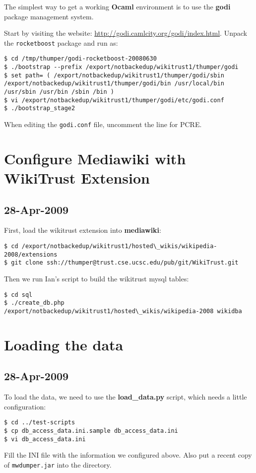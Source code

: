 The simplest way to get a working \textbf{Ocaml} environment is
to use the \textbf{godi} package management system.

Start by visiting the website:
\url{http://godi.camlcity.org/godi/index.html}.
Unpack the \texttt{rocketboost} package and run as:
\begin{verbatim}
$ cd /tmp/thumper/godi-rocketboost-20080630
$ ./bootstrap --prefix /export/notbackedup/wikitrust1/thumper/godi
$ set path= ( /export/notbackedup/wikitrust1/thumper/godi/sbin /export/notbackedup/wikitrust1/thumper/godi/bin /usr/local/bin /usr/sbin /usr/bin /sbin /bin )
$ vi /export/notbackedup/wikitrust1/thumper/godi/etc/godi.conf
$ ./bootstrap_stage2
\end{verbatim}
When editing the \texttt{godi.conf} file, uncomment the line
for PCRE.


\section{Configure Mediawiki with WikiTrust Extension}

\subsection{28-Apr-2009}

First, load the wikitrust extension into \textbf{mediawiki}:
\begin{verbatim}
$ cd /export/notbackedup/wikitrust1/hosted\_wikis/wikipedia-2008/extensions
$ git clone ssh://thumper@trust.cse.ucsc.edu/pub/git/WikiTrust.git
\end{verbatim}

Then we run Ian's script to build the wikitrust mysql tables:
\begin{verbatim}
$ cd sql
$ ./create_db.php /export/notbackedup/wikitrust1/hosted\_wikis/wikipedia-2008 wikidba
\end{verbatim}

\section{Loading the data}

\subsection{28-Apr-2009}

To load the data, we need to use the \textbf{load\_data.py} script,
which needs a little configuration:
\begin{verbatim}
$ cd ../test-scripts
$ cp db_access_data.ini.sample db_access_data.ini
$ vi db_access_data.ini
\end{verbatim}
Fill the INI file with the information we configured above.
Also put a recent copy of \texttt{mwdumper.jar} into the directory.

